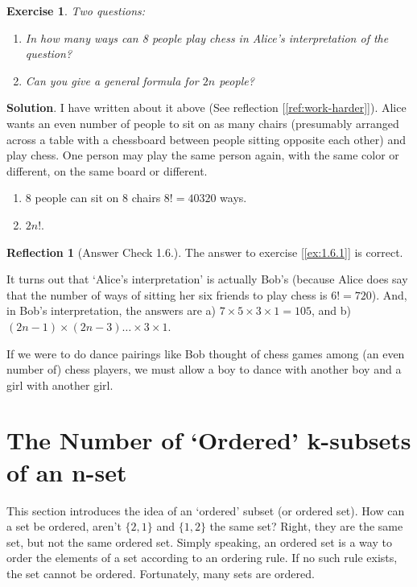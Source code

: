 \documentclass[11pt]{book}
\theoremstyle{definition}
\theoremstyle{plain}
\newtheorem{exercise}{Exercise}
\theoremstyle{definition}
\theoremstyle{problemstyle}
\theoremstyle{remark}
\theoremstyle{definition}
\newtheorem{reflection}{Reflection}
\begin{document}
\begin{exercise}
    \label{ex:1.6.2}
    Two questions:
    \begin{enumerate}[label=({\alph*})]
        \item In how many ways can 8 people play chess in Alice's interpretation of the question?
        \item Can you give a general formula for $2n$ people?
    \end{enumerate}
\end{exercise}
\textbf{Solution}.
I have written about it above (See reflection [\ref{ref:work-harder}]). Alice wants an even number of people to sit on as many chairs (presumably arranged across a table with a chessboard between people sitting opposite each other) and play chess. One person may play the same person again, with the same color or different, on the same board or different.
    \begin{enumerate}[label=({\alph*})]
        \item $8$ people can sit on $8$ chairs $8!=\num{40320}$ ways.
        \item $2n!$.

    \end{enumerate}

\begin{reflection}[Answer Check 1.6.\textasteriskcentered]
    The answer to exercise [\ref{ex:1.6.1}] is correct.

    It turns out that `Alice's interpretation' is actually Bob's (because Alice does say that the number of ways of sitting her six friends to play chess is $6!=720$). And, in Bob's interpretation, the answers are a) $7\times5\times3\times1=105$, and b) $(2n-1)\times(2n-3)\dots\times3\times1$.

    If we were to do dance pairings like Bob thought of chess games among (an even number of) chess players, we must allow a boy to dance with another boy and a girl with another girl.
\end{reflection}

\section{The Number of `Ordered' k-subsets of an n-set}
This section introduces the idea of an `ordered' subset (or ordered set). How can a set be ordered, aren't $\{2,1\}$ and $\{1,2\}$ the same set? Right, they are the same set, but not the same ordered set. Simply speaking, an ordered set is a way to order the elements of a set according to an ordering rule. If no such rule exists, the set cannot be ordered. Fortunately, many sets are ordered.
\end{document}
